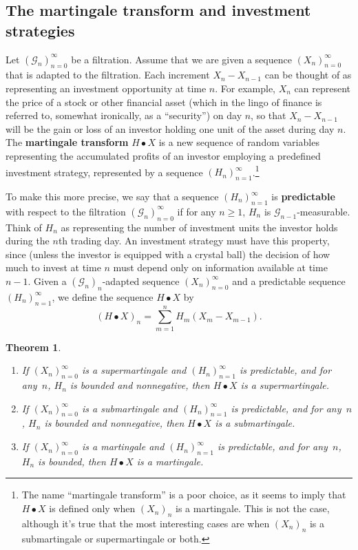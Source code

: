 \documentclass[12pt]{article}
\newtheorem{thm}{Theorem}[section]
\theoremstyle{example}
\begin{document}
\subsection{The martingale transform and investment strategies}

Let $(\mathcal{G}_n)_{n=0}^\infty$ be a filtration. Assume that we are given a sequence $(X_n)_{n=0}^\infty$ that is adapted to the filtration. Each increment $X_n-X_{n-1}$ can be thought of as representing an investment opportunity at time $n$. For example, $X_n$ can represent the price of a stock or other financial asset (which in the lingo of finance is referred to, somewhat  ironically, as a ``security'') on day $n$, so that $X_n-X_{n-1}$ will be the gain or loss of an investor holding one unit of the asset during day $n$. The \textbf{martingale transform} $H\bullet X$ is a new sequence of random variables representing the accumulated profits of an investor employing a predefined investment strategy, represented by a sequence $(H_n)_{n=1}^\infty$.\footnote{The name ``martingale transform'' is a poor choice, as it seems to imply that $H\bullet X$ is defined only when $(X_n)_n$ is a martingale. This is not the case, although it's true that the most interesting cases are when $(X_n)_n$ is a submartingale or supermartingale or both.}

To make this more precise, we say that a sequence $(H_n)_{n=1}^\infty$ is \textbf{predictable} with respect to the filtration $(\mathcal{G}_n)_{n=0}^\infty$ if for any $n\ge 1$, $H_n$ is $\mathcal{G}_{n-1}$-measurable. Think of $H_n$ as representing the number of investment units the investor holds during the $n$th trading day. An investment strategy must have this property, since (unless the investor is equipped with a crystal ball) the decision of how much to invest at time $n$ must depend only on information available at time $n-1$. Given a $(\mathcal{G}_n)_n$-adapted sequence $(X_n)_{n=0}^\infty$ and a predictable sequence $(H_n)_{n=1}^\infty$, we define the sequence $H\bullet X$ by
$$ (H\bullet X)_n = \sum_{m=1}^n H_m(X_m-X_{m-1}). $$

\begin{thm} \label{thm-marting-transform}
\begin{enumerate}
\item If $(X_n)_{n=0}^\infty$ is a supermartingale and $(H_n)_{n=1}^\infty$ is predictable, and for any~$n$, $H_n$ is bounded and nonnegative, then $H\bullet X$ is a supermartingale.
\item If $(X_n)_{n=0}^\infty$ is a submartingale and $(H_n)_{n=1}^\infty$ is predictable, and for any~$n$, $H_n$ is bounded and nonnegative, then $H\bullet X$ is a submartingale.
\item If $(X_n)_{n=0}^\infty$ is a martingale and $(H_n)_{n=1}^\infty$ is predictable, and for any~$n$, $H_n$ is bounded, then $H\bullet X$ is a martingale.
\end{enumerate}
\end{thm}
\end{document}
